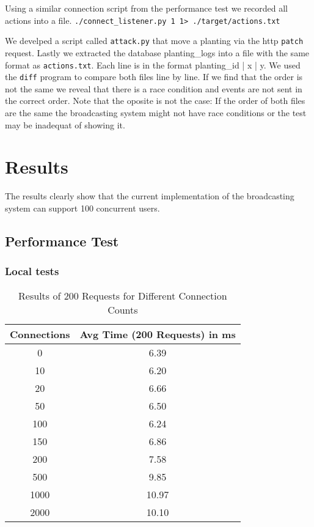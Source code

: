 \documentclass[final,draft,oneside]{vutinfth}
\begin{document}
Using a similar connection script from the performance test we recorded all actions into a file. \texttt{./connect\_listener.py 1 1> ./target/actions.txt}

We develped a script called \texttt{attack.py} that move a planting via the \gls{http} \texttt{patch} request.
Lastly we extracted the database planting\_logs into a file with the same format as \texttt{actions.txt}.
Each line is in the format planting\_id | x | y.
We used the \texttt{diff} program to compare both files line by line.
If we find that the order is not the same we reveal that there is a race condition and events are not sent in the correct order. 
Note that the oposite is not the case: If the order of both files are the same the broadcasting system might not have race conditions or the test may be inadequat of showing it.

\chapter{Results}

The results clearly show that the current implementation of the broadcasting system can support 100 concurrent users.

\section{Performance Test}
\subsection{Local tests}

\begin{table}[h!]
    \centering
    \begin{tabular}{cc}
        \toprule
        \textbf{Connections} & \textbf{Avg Time (200 Requests) in ms} \\
        \midrule
        0 & 6.39 \\
        10 & 6.20 \\
        20 & 6.66 \\
        50 & 6.50 \\
        100 & 6.24 \\
        150 & 6.86 \\
        200 & 7.58 \\
        500 & 9.85 \\
        1000 & 10.97 \\
        2000 & 10.10 \\
        \bottomrule
    \end{tabular}
    \caption{Results of 200 Requests for Different Connection Counts}
\end{table}
\end{document}
